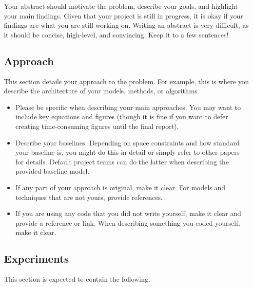 \documentclass[11pt,a4paper]{article}
\begin{document}
Your abstract should motivate the problem, describe your goals, and highlight your main findings. Given that your project is still in progress, it is okay if your findings are what you are still working on. Writing an abstract is very difficult, as it should be concise, high-level, and convincing. Keep it to a few sentences!

\subsection*{Approach}

This section details your approach to the problem. For example, this is where you describe the architecture of your models, methods, or algorithms.

\begin{itemize}[nosep]
    \item Please be specific when describing your main approaches. You may want to include key equations and figures (though it is fine if you want to defer creating time-consuming figures until the final report).
    \item Describe your baselines. Depending on space constraints and how standard your baseline is, you might do this in detail or simply refer to other papers for details. Default project teams can do the latter when describing the provided baseline model.
    \item If any part of your approach is original, make it clear. For models and techniques that are not yours, provide references.
    \item If you are using any code that you did not write yourself, make it clear and provide a reference or link. When describing something you coded yourself, make it clear.
\end{itemize}

\subsection*{Experiments}

This section is expected to contain the following.
\end{document}
